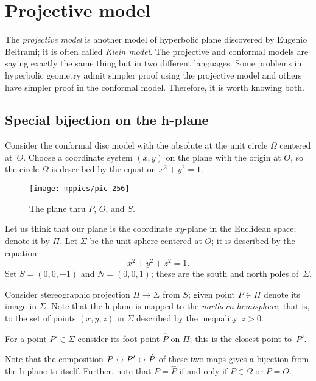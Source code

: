 \chapter{Projective model}\label{chap:klein}

The {}\emph{projective model} is another model of hyperbolic plane discovered by Eugenio Beltrami; it is often called {}\emph{Klein model}.
The projective and conformal models are saying exactly the same thing but in two different languages. 
Some problems in hyperbolic geometry admit simpler proof using the projective model and others have simpler proof in the conformal model.
Therefore, it is worth knowing both. 

\section{Special bijection on the h-plane}
\label{sec:special-bijection}

Consider the conformal disc model with the absolute at the unit circle $\Omega$ centered at~$O$.
Choose a coordinate system $(x,y)$ on the plane with the origin at $O$, 
so the circle $\Omega$ is described by the equation $x^2+y^2=1$.

{

\label{pic:stereographic_projection-klein}
\begin{wrapfigure}[17]{o}{48mm}
\centering
\texttt{[image: mppics/pic-256]}
\caption*{The plane thru $P$, $O$, and $S$.}
\end{wrapfigure}

Let us think that our plane is the coordinate $xy$-plane in the Euclidean space; denote it by $\Pi$.
Let $\Sigma$ be the unit sphere centered at $O$;
it is described by the equation 
$$x^2+y^2+z^2=1.$$
Set $S=(0,0,-1)$ and $N=(0,0,1)$; 
these are the south and north poles of~$\Sigma$.

Consider stereographic projection $\Pi\to\Sigma$ from $S$;
given point $P\in\Pi$ denote its image in $\Sigma$.
Note that the  h-plane is mapped to the {}\emph{northern hemisphere};
that is, to the set of points $(x,y,z)$ in $\Sigma$ described by the inequality~$z>0$.

}

For a point $P'\in \Sigma$ consider its foot point $\hat P$
on $\Pi$;
this is the closest point to~$P'$.

Note that the composition $P\z\leftrightarrow P'\z\leftrightarrow\hat P$ of these two maps
gives a bijection from the h-plane to itself.
Further, note that $P=\hat P$
 if and only if  $P\in \Omega$ or $P=O$.

